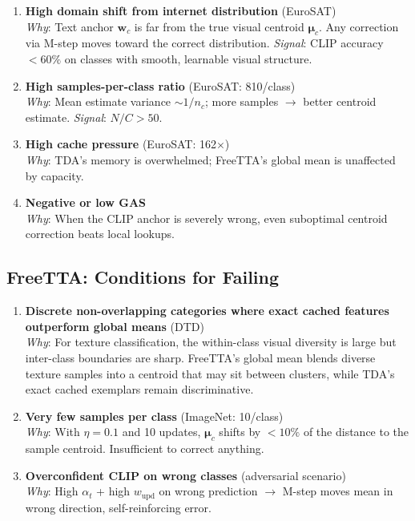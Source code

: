 \documentclass[12pt,a4paper]{article}
\newcommand{\bw}{\mathbf{w}}
\newcommand{\bmu}{\boldsymbol{\mu}}
\newcommand{\1}{\mathbf{1}}
\begin{document}
\begin{enumerate}
  \item \textbf{High domain shift from internet distribution} (EuroSAT)\\
  \textit{Why}: Text anchor $\bw_c$ is far from the true visual centroid $\bmu_c$.
  Any correction via M-step moves toward the correct distribution.
  \textit{Signal}: CLIP accuracy $< 60\%$ on classes with smooth, learnable visual structure.

  \item \textbf{High samples-per-class ratio} (EuroSAT: 810/class)\\
  \textit{Why}: Mean estimate variance $\sim 1/n_c$; more samples $\to$ better centroid estimate.
  \textit{Signal}: $N/C > 50$.

  \item \textbf{High cache pressure} (EuroSAT: 162$\times$)\\
  \textit{Why}: TDA's memory is overwhelmed; FreeTTA's global mean is unaffected by capacity.

  \item \textbf{Negative or low GAS}\\
  \textit{Why}: When the CLIP anchor is severely wrong, even suboptimal centroid correction beats local lookups.
\end{enumerate}

\subsection{FreeTTA: Conditions for Failing}

\begin{enumerate}
  \item \textbf{Discrete non-overlapping categories where exact cached features outperform global means} (DTD)\\
  \textit{Why}: For texture classification, the within-class visual diversity is large but inter-class boundaries are sharp.
  FreeTTA's global mean blends diverse texture samples into a centroid that may sit between clusters, while TDA's exact cached exemplars remain discriminative.

  \item \textbf{Very few samples per class} (ImageNet: 10/class)\\
  \textit{Why}: With $\eta=0.1$ and 10 updates, $\bmu_c$ shifts by $<10\%$ of the distance to the sample centroid.
  Insufficient to correct anything.

  \item \textbf{Overconfident CLIP on wrong classes} (adversarial scenario)\\
  \textit{Why}: High $\alpha_t$ + high $w_{\text{upd}}$ on wrong prediction $\to$ M-step moves mean in wrong direction, self-reinforcing error.
\end{enumerate}
\end{document}
